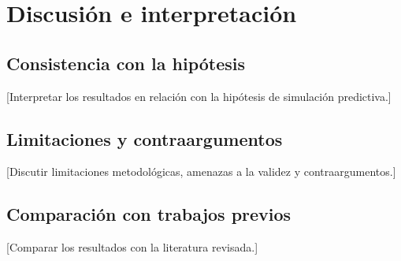 \chapter{Discusión e interpretación}

\section{Consistencia con la hipótesis}
[Interpretar los resultados en relación con la hipótesis de simulación predictiva.]

\section{Limitaciones y contraargumentos}
[Discutir limitaciones metodológicas, amenazas a la validez y contraargumentos.]

\section{Comparación con trabajos previos}
[Comparar los resultados con la literatura revisada.]
